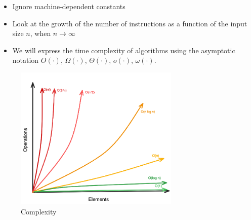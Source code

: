 \begin{itemize}
    \item Ignore machine-dependent constants 
    \item Look at the growth of the number of instructions as a function of the input size $n$, when $n \to \infty$
    \item We will express the time complexity of algorithms using the asymptotic notation $O(\cdot)$, $\Omega(\cdot)$, $\Theta(\cdot)$, $o(\cdot)$, $\omega(\cdot)$.
\end{itemize}

\begin{figure}[H]
    \centering
    \includegraphics[width=0.7\textwidth]{assets/complexity.png}
    \caption{Complexity}
\end{figure}

